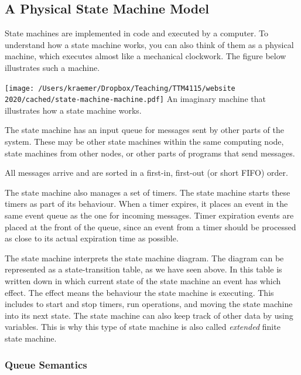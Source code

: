 \documentclass[10pt, twoside, twocolumn]{book}
\renewcommand{\caption}{}
\let\origfigure=\figure
\let\endorigfigure=\endfigure
\renewenvironment{figure}[1][]{%
  \origfigure[H]
}{%
  \endorigfigure
}
\begin{document}
\hypertarget{a-physical-state-machine-model}{%
\subsection{A Physical State Machine
Model}\label{a-physical-state-machine-model}}

State machines are implemented in code and executed by a computer. To
understand how a state machine works, you can also think of them as a
physical machine, which executes almost like a mechanical clockwork. The
figure below illustrates such a machine.

\begin{figure}[htbp]
\begin{center}
\texttt{[image: /Users/kraemer/Dropbox/Teaching/TTM4115/website 2020/cached/state-machine-machine.pdf]}%
\caption{An imaginary machine that illustrates how a state machine works.}
\label{default}
\end{center}
\end{figure}
The state machine has an input queue for messages sent by other parts of
the system. These may be other state machines within the same computing
node, state machines from other nodes, or other parts of programs that
send messages.

All messages arrive and are sorted in a first-in, first-out (or short
FIFO) order.

The state machine also manages a set of timers. The state machine starts
these timers as part of its behaviour. When a timer expires, it places
an event in the same event queue as the one for incoming messages. Timer
expiration events are placed at the front of the queue, since an event
from a timer should be processed as close to its actual expiration time
as possible.

The state machine interprets the state machine diagram. The diagram can
be represented as a state-transition table, as we have seen above. In
this table is written down in which current state of the state machine
an event has which effect. The effect means the behaviour the state
machine is executing. This includes to start and stop timers, run
operations, and moving the state machine into its next state. The state
machine can also keep track of other data by using variables. This is
why this type of state machine is also called \emph{extended} finite
state machine.

\hypertarget{queue-semantics}{%
\subsubsection{Queue Semantics}\label{queue-semantics}}
\end{document}
